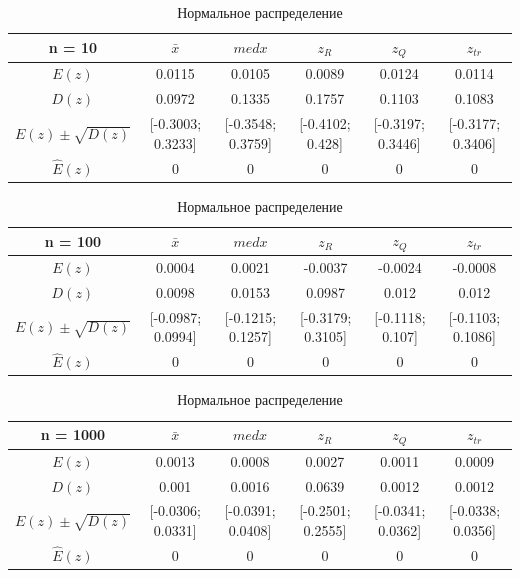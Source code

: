 \documentclass[12pt]{article}
\begin{document}
\begin{center}
  \begin{table}[!hbt]
\caption{Нормальное распределение}
\begin{adjustbox}{width=\textwidth}
\begin{tabular}{| c | c | c | c | c | c |}
\hline
n = 10 & $\bar{x}$ & $med x$ & $z_R$ & $z_Q$ & $z_{tr}$ \\\hline
$E(z)$ & 0.0115 & 0.0105 & 0.0089 & 0.0124 & 0.0114 \\\hline
$D(z)$ & 0.0972 & 0.1335 & 0.1757 & 0.1103 & 0.1083 \\\hline
$E(z) \pm \sqrt{D(z)}$ & [-0.3003; 0.3233] & [-0.3548; 0.3759] & [-0.4102; 0.428] & [-0.3197; 0.3446] & [-0.3177; 0.3406]\\\hline
$\hat{E}(z)$ & 0 & 0 & 0 & 0 & 0 \\\hline
\end{tabular}
\end{adjustbox}

\begin{adjustbox}{width=\textwidth}
\begin{tabular}{| c | c | c | c | c | c |}
\hline
n = 100 & $\bar{x}$ & $med x$ & $z_R$ & $z_Q$ & $z_{tr}$ \\\hline
$E(z)$ & 0.0004 & 0.0021 & -0.0037 & -0.0024 & -0.0008 \\\hline
$D(z)$ & 0.0098 & 0.0153 & 0.0987 & 0.012 & 0.012 \\\hline
$E(z) \pm \sqrt{D(z)}$ & [-0.0987; 0.0994] & [-0.1215; 0.1257] & [-0.3179; 0.3105] & [-0.1118; 0.107] & [-0.1103; 0.1086]\\\hline
$\hat{E}(z)$ & 0 & 0 & 0 & 0 & 0 \\\hline
\end{tabular}
\end{adjustbox}

\begin{adjustbox}{width=\textwidth}
\begin{tabular}{| c | c | c | c | c | c |}
\hline
n = 1000 & $\bar{x}$ & $med x$ & $z_R$ & $z_Q$ & $z_{tr}$ \\\hline
$E(z)$ & 0.0013 & 0.0008 & 0.0027 & 0.0011 & 0.0009 \\\hline
$D(z)$ & 0.001 & 0.0016 & 0.0639 & 0.0012 & 0.0012 \\\hline
$E(z) \pm \sqrt{D(z)}$ & [-0.0306; 0.0331] & [-0.0391; 0.0408] & [-0.2501; 0.2555] & [-0.0341; 0.0362] & [-0.0338; 0.0356]\\\hline
$\hat{E}(z)$ & 0 & 0 & 0 & 0 & 0 \\\hline
\end{tabular}
\end{adjustbox}


\end{table}
\end{center}
\end{document}
